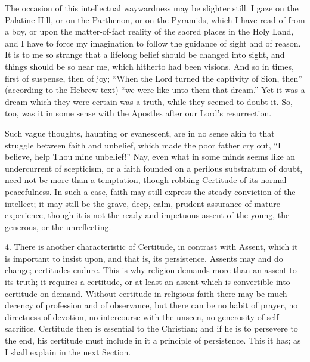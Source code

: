 The occasion of this intellectual waywardness may be slighter
still. I gaze on the Palatine Hill, or on the Parthenon, or on the
Pyramids, which I have read of from a boy, or upon the matter-of-fact
reality of the sacred places in the Holy Land, and I have to force my
imagination to follow the guidance of sight and of reason. It is to me
so strange that a lifelong belief should be changed into sight, and
things should be so near me, which hitherto had been visions. And so
in times, first of suspense, then of joy; ``When the Lord
turned the captivity of Sion, then'' (according to the Hebrew
text) ``we were like unto them that dream.'' Yet it was a
dream which they were certain was a truth, while they seemed to doubt
it. So, too, was it in some sense with the Apostles after our Lord's
resurrection.

Such vague thoughts, haunting or evanescent, are in no sense akin
to that struggle between faith and unbelief, which made the poor
father cry out, ``I believe, help Thou mine unbelief!'' Nay,
even what in some minds seems like an undercurrent of scepticism, or a
faith founded on a perilous substratum of doubt, need not be more than
a temptation, though robbing Certitude of its normal peacefulness. In
such a case, faith may still express the steady conviction of the
intellect; it may still be the grave, deep, calm, prudent assurance of
mature experience, though it is not the ready and impetuous assent of
the young, the generous, or the unreflecting.

4. There is another characteristic of Certitude, in contrast with
Assent, which it is important to insist upon, and that is, its
persistence. Assents may and do change; certitudes endure. This is why
religion demands more than an assent to its truth; it requires a
certitude, or at least an assent which is convertible into certitude
on demand. Without certitude in religious faith there may be much
decency of profession and of observance, but there can be no habit of
prayer, no directness of devotion, no intercourse with the unseen, no
generosity of self-sacrifice. Certitude then is essential to the
Christian; and if he is to persevere to the end, his certitude must
include in it a principle of persistence. This it has; as I shall
explain in the next Section.


